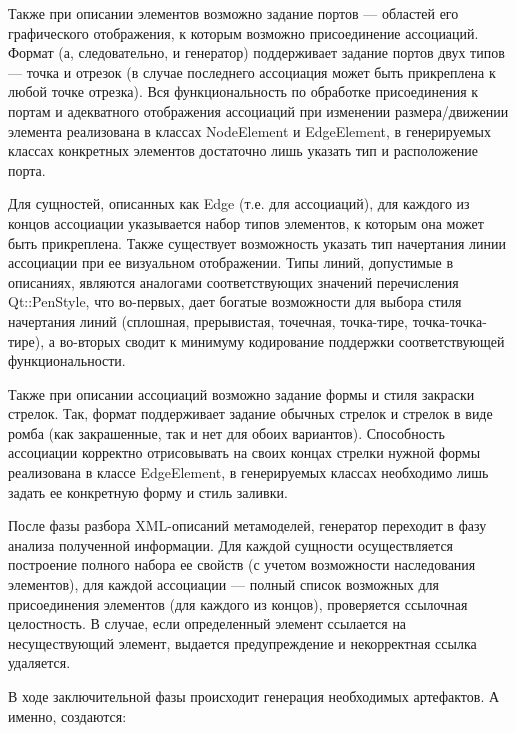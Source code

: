 \documentclass[a5paper]{article}
\begin{document}
Также при описании элементов возможно задание портов --- областей его
графического отображения, к которым возможно присоединение ассоциаций.
Формат (а, следовательно, и генератор) поддерживает задание портов двух
типов --- точка и отрезок (в случае последнего ассоциация может быть
прикреплена к любой точке отрезка). Вся функциональность по обработке
присоединения к портам и адекватного отображения ассоциаций при
изменении размера/движении элемента реализована в классах
NodeElement и EdgeElement, в генерируемых классах
конкретных элементов достаточно лишь указать тип и расположение порта.

Для сущностей, описанных как Edge (т.е. для
ассоциаций), для каждого из концов ассоциации указывается набор типов
элементов, к которым она может быть прикреплена. Также существует
возможность указать тип начертания линии ассоциации при ее визуальном
отображении. Типы линий, допустимые в описаниях, являются аналогами
соответствующих значений перечисления Qt::PenStyle, что
во-первых, дает богатые возможности для выбора стиля начертания линий
(сплошная, прерывистая, точечная, точка-тире, точка-точка-тире), а
во-вторых сводит к минимуму кодирование поддержки соответствующей
функциональности.

Также при описании ассоциаций возможно задание формы и стиля закраски
стрелок. Так, формат поддерживает задание обычных стрелок и стрелок в
виде ромба (как закрашенные, так и нет для обоих вариантов).
Способность ассоциации корректно отрисовывать на своих концах стрелки
нужной формы реализована в классе EdgeElement, в генерируемых классах
необходимо лишь задать ее конкретную форму и стиль заливки.

После фазы разбора XML-описаний
метамоделей, генератор переходит в фазу анализа полученной информации.
Для каждой сущности осуществляется построение полного набора ее свойств
(с учетом возможности наследования элементов), для каждой ассоциации ---
полный список возможных для присоединения элементов (для каждого из
концов), проверяется ссылочная целостность. В случае, если определенный
элемент ссылается на несуществующий элемент, выдается предупреждение и
некорректная ссылка удаляется. 

В ходе заключительной фазы происходит генерация необходимых артефактов.
А именно, создаются:
\end{document}
